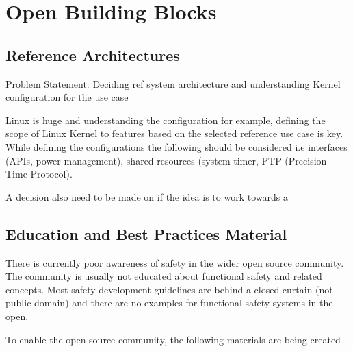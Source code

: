 \documentclass[12pt]{ElisaPaper}
\begin{document}
\section{Open Building Blocks}

\subsection{Reference Architectures}
Problem Statement: Deciding ref system architecture and understanding Kernel configuration for the use case

Linux is huge and understanding the configuration for example, defining the scope of Linux Kernel to features based on the selected reference use case is key. 
While defining the configurations the following should be considered i.e interfaces (APIs, power management), shared resources (system timer, PTP (Precision Time Protocol). 

A decision also need to be made on if the idea is to work towards a  
\subsection{Education and Best Practices Material}
There is currently poor awareness of safety in the wider open source community. 
The  community is usually not educated about functional safety and related concepts. 
Most safety development guidelines are behind a closed curtain (not public domain) and there are no examples for functional safety systems in the open.

To enable the open source community, the following materials are being created
\end{document}
